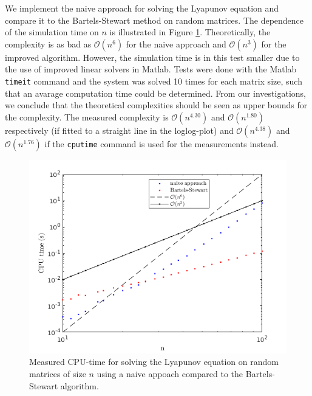 We implement the naive approach for solving the Lyapunov equation and compare it to the Bartels-Stewart method on random matrices. The dependence of the simulation time on $n$ is illustrated in Figure \ref{task1}. Theoretically, the complexity is as bad as $\mathcal O(n^6)$ for the naive approach and $\mathcal O(n^3)$ for the improved algorithm. However, the simulation time is in this test smaller due to the use of improved linear solvers in Matlab. Tests were done with the Matlab \texttt{timeit} command and the system was solved 10 times for each matrix size, such that an avarage computation time could be determined. From our investigations, we conclude that the theoretical complexities should be seen as upper bounds for the complexity. The measured complexity is $\mathcal O(n^{4.30})$ and $\mathcal O(n^{1.80})$  respectively (if fitted to a straight line in the loglog-plot) and $\mathcal O(n^{4.38})$ and $\mathcal O(n^{1.76})$ if the \texttt{cputime} command is used for the measurements instead. 
\begin{figure}[h!]
\centering
\includegraphics[scale=0.5]{cpu.png}
\caption{Measured CPU-time for solving the Lyapunov equation on random matrices of size $n$ using a naive appoach compared to the Bartels-Stewart algorithm.}
\label{task1}
\end{figure}

